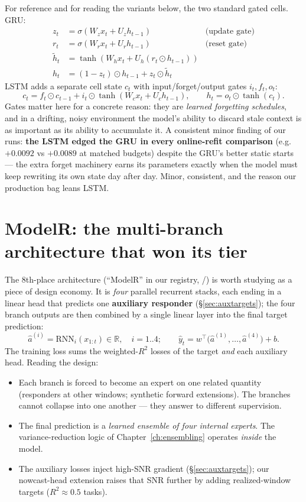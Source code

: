 For reference and for reading the variants below, the two standard gated
cells. GRU:
\begin{align*}
z_t &= \sigma(W_z x_t + U_z h_{t-1}) &\text{(update gate)}\\
r_t &= \sigma(W_r x_t + U_r h_{t-1}) &\text{(reset gate)}\\
\tilde h_t &= \tanh(W_h x_t + U_h (r_t \odot h_{t-1}))\\
h_t &= (1 - z_t) \odot h_{t-1} + z_t \odot \tilde h_t
\end{align*}
LSTM adds a separate cell state $c_t$ with input/forget/output gates
$i_t, f_t, o_t$:
\[
c_t = f_t \odot c_{t-1} + i_t \odot \tanh(W_c x_t + U_c h_{t-1}),
\qquad h_t = o_t \odot \tanh(c_t).
\]
Gates matter here for a concrete reason: they are \emph{learned forgetting
schedules}, and in a drifting, noisy environment the model's ability to
discard stale context is as important as its ability to accumulate it. A
consistent minor finding of our runs: \textbf{the LSTM edged the GRU in
every online-refit comparison} (e.g.\ $+0.0092$ vs $+0.0089$ at matched
budgets) despite the GRU's better static starts --- the extra forget
machinery earns its parameters exactly when the model must keep rewriting
its own state day after day. Minor, consistent, and the reason our
production bag leans LSTM.

\section{ModelR: the multi-branch architecture that won its tier}

The 8th-place architecture (``ModelR'' in our registry,
/) is worth studying as a piece of
design economy. It is \emph{four} parallel recurrent stacks, each ending in
a linear head that predicts one \textbf{auxiliary responder}
(\S\ref{sec:auxtargets}); the four branch outputs are then combined by a
single linear layer into the final target prediction:
\[
\hat a^{(i)} = \text{RNN}_i(x_{1:t}) \in \mathbb R, \quad i = 1..4;
\qquad
\hat y_t = w^\top \big(\hat a^{(1)}, \dots, \hat a^{(4)}\big) + b .
\]
The training loss sums the weighted-$R^2$ losses of the target \emph{and}
each auxiliary head. Reading the design:

\begin{itemize}
\item Each branch is forced to become an expert on one related quantity
  (responders at other windows; synthetic forward extensions). The
  branches cannot collapse into one another --- they answer to different
  supervision.
\item The final prediction is a \emph{learned ensemble of four internal
  experts}. The variance-reduction logic of
  Chapter~\ref{ch:ensembling} operates \emph{inside} the model.
\item The auxiliary losses inject high-SNR gradient
  (\S\ref{sec:auxtargets}); our nowcast-head extension raises that SNR
  further by adding realized-window targets ($R^2 \approx 0.5$ tasks).
\end{itemize}

